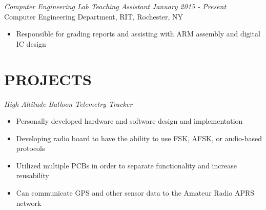 \documentclass[line,margin]{res}
\begin{document}
\begin{resume}

	\vspace{-5pt}
{\sl Computer Engineering Lab Teaching Assistant } \hfill {\sl January 2015 - Present} \\
	Computer Engineering Department, RIT, Rochester, NY
	\begin{itemize}  \itemsep -2pt %
		\item Responsible for grading reports and assisting with ARM assembly and digital IC design
	\end{itemize} 



\section{PROJECTS}
	{\sl High Altitude Balloon Telemetry Tracker }
		\begin{itemize} \itemsep -2pt
			\item Personally developed hardware and software design and implementation
			\item Developing radio board to have the ability to use FSK, AFSK, or audio-based protocols
			\item Utilized multiple PCBs in order to separate functionality and increase reusability
			\item Can communicate GPS and other sensor data to the Amateur Radio APRS network
		\end{itemize}

			

\end{resume}
\end{document}

